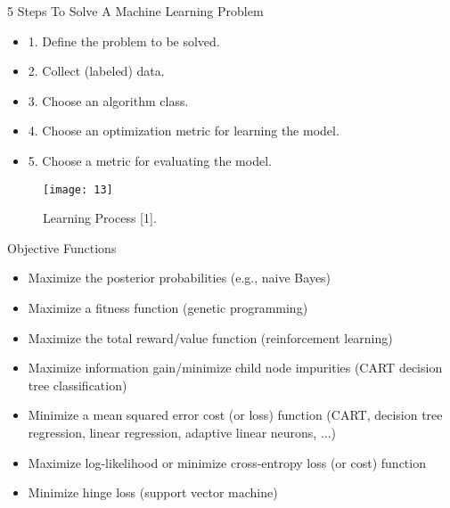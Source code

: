 \documentclass[compress,oilve]{beamer}
\begin{document}
\begin{frame}{5 Steps To Solve A Machine Learning Problem}
\begin{itemize}
\item 1. Define the problem to be solved.
\item 2. Collect (labeled) data.
\item 3. Choose an algorithm class.
\item 4. Choose an optimization metric for learning the model.
\item 5. Choose a metric for evaluating the model.
\end{itemize}
\begin{figure}
 \centering
 \texttt{[image: 13]}  
 \caption{Learning Process [1].}
\end{figure}
\end{frame}

\begin{frame}{Objective Functions}
\begin{itemize}
\item Maximize the posterior probabilities (e.g., naive Bayes)
\item Maximize a fitness function (genetic programming)
\item Maximize the total reward/value function (reinforcement learning)
\item Maximize information gain/minimize child node impurities (CART decision tree classification)
\item Minimize a mean squared error cost (or loss) function (CART, decision tree regression, linear regression, adaptive linear neurons, ...)
\item Maximize log-likelihood or minimize cross-entropy loss (or cost) function
\item Minimize hinge loss (support vector machine)
\end{itemize}
\end{frame}
\end{document}

